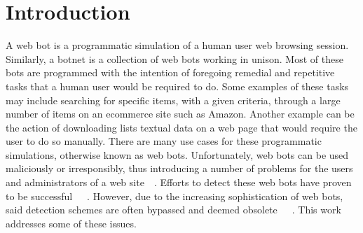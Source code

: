 ﻿
\chapter{Introduction}
A web bot is a programmatic simulation of a human user web browsing session. Similarly, a botnet is a collection of web bots working in unison. Most of these bots are programmed with the intention of foregoing remedial and repetitive tasks that a human user would be required to do. Some examples of these tasks may include searching for specific items, with a given criteria, through a large number of items on an ecommerce site such as Amazon. Another example can be the action of downloading lists textual data on a web page that would require the user to do so manually. There are many use cases for these programmatic simulations, otherwise known as web bots. Unfortunately, web bots can be used maliciously or irresponsibly, thus introducing a number of problems for the users and administrators of a web site~\cite{1ee426975c3d46d2ba6ef5c2d76384c5}~\cite{bad_bot_report}. Efforts to detect these web bots have proven to be successful~\cite{akamai_bot_detection}~\cite{Hamidzadeh2018}~\cite{ZABIHIMAYVAN2017129}. However, due to the increasing sophistication of web bots, said detection schemes are often bypassed and deemed obsolete~\cite{ROVETTA2020102577}~\cite{STEVANOVIC2013698}~\cite{10.1109/DSN.2013.6575366}. This work addresses some of these issues.
